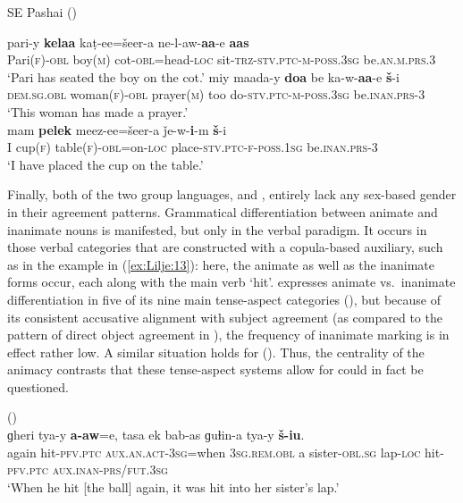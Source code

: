\documentclass[output=collectionpaper]{langsci/langscibook}
\begin{document}
\ea
\label{ex:Lilje:12}
SE Pashai (\citealt[290, 297]{Lehr2014})\\
\begin{xlist}
\ex
\gll pari-y \textbf{kelaa} kaṭ-ee=šeer-a ne-l-aw-\textbf{aa}-e \textbf{aas}\\
Pari(\textsc{f})-\textsc{obl} boy(\textsc{m}) cot-\textsc{obl}=head-\textsc{loc} sit-\textsc{trz-stv.ptc-m-poss.3sg} be.\textsc{an.m.prs.3}\\
\glt `Pari has seated the boy on the cot.'
\ex
\gll miy maada-y \textbf{doa} be ka-w-\textbf{aa}-e \textbf{š}-i\\
\textsc{dem.sg.obl} woman(\textsc{f})-\textsc{obl} prayer(\textsc{m}) too do-\textsc{stv.ptc-m-poss.3sg} be.\textsc{inan.prs-3}  \\
\glt `This woman has made a prayer.' \\
\ex
\gll mam \textbf{pelek} meez-ee=šeer-a ǰe-w-\textbf{i}-m \textbf{š}-i\\
I cup(\textsc{f}) table(\textsc{f})-\textsc{obl}=on-\textsc{loc} place-\textsc{stv.ptc-f-poss.1sg} be.\textsc{inan.prs-3}   \\
\glt `I have placed the cup on the table.'
\end{xlist}
\z

Finally, both of the two  group languages,  and , entirely lack any sex-based gender in their agreement patterns. Grammatical differentiation between animate and inanimate nouns is manifested, but only in the verbal paradigm. It occurs in those verbal categories that are constructed with a copula-based auxiliary, such as in the  example in (\ref{ex:Lilje:13}): here, the animate as well as the inanimate forms occur, each along with the main verb `hit'.  expresses animate vs.\ inanimate differentiation in five of its nine main tense-aspect categories (\citealt[60--72]{Bashir1988}), but because of its consistent accusative alignment with subject agreement (as compared to the pattern of direct object agreement in ), the frequency of inanimate marking is in effect rather low. A similar situation holds for  (\citealt[123--133]{Bashir1988}). Thus, the centrality of the animacy contrasts that these tense-aspect systems allow for could in fact be questioned.

\ea
\label{ex:Lilje:13}
 (\citealt[250]{HeegardPetersen2015})\\
\gll ɡheri tya{}-y \textbf{a{}-}\textbf{aw}=e, tasa ek bab{}-as ɡuɫin{}-a tya{}-y \textbf{š{}-}\textbf{iu}.    \\
again hit-\textsc{pfv.ptc} \textsc{aux.an.act-3sg}=when \textsc{3sg.rem.obl} a sister-\textsc{obl.sg} lap-\textsc{loc} hit-\textsc{pfv.ptc} \textsc{aux.inan-prs/fut.3sg}\\
\glt `When he hit [the ball] again, it was hit into her sister's lap.'
\z
\end{document}
